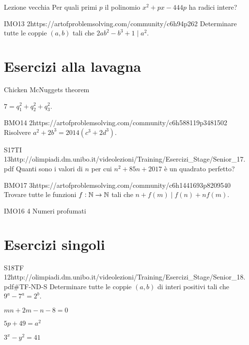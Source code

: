 \documentclass[12pt]{article}
\begin{document}
\begin{esercizio}{Lezione vecchia}{}
    Per quali primi $p$ il polinomio $x^2+px-444p$ ha radici intere?
\end{esercizio}

\begin{esercizio}{IMO13 2}{https://artofproblemsolving.com/community/c6h94p262}
    Determinare tutte le coppie $(a,b)$ tali che $2ab^2-b^3+1\mid a^2$.
\end{esercizio}

\section{Esercizi alla lavagna}

Chicken McNuggets theorem

$7=q_1^2+q_2^2+q_3^2$.

\begin{esercizio}{BMO14 2}{https://artofproblemsolving.com/community/c6h588119p3481502}
    Risolvere $a^2+2b^3=2014(c^3+2d^3)$.
\end{esercizio}

\begin{esercizio}{S17TI 13}{http://olimpiadi.dm.unibo.it/videolezioni/Training/Esercizi_Stage/Senior_17.pdf}
    Quanti sono i valori di $n$ per cui $n^2+85n+2017$ è un quadrato perfetto?
\end{esercizio}

\begin{esercizio}{BMO17 3}{https://artofproblemsolving.com/community/c6h1441693p8209540}
    Trovare tutte le funzioni $f:\mathbb{N}\to\mathbb{N}$ tali che $n+f(m)\mid f(n)+nf(m)$.
\end{esercizio}

\begin{esercizio}{IMO16 4}{}
    Numeri profumati
\end{esercizio}



\section{Esercizi singoli}

\begin{esercizio}{S18TF 12}{http://olimpiadi.dm.unibo.it/videolezioni/Training/Esercizi_Stage/Senior_18.pdf\#TF-ND-S}
    Determinare tutte le coppie $(a,b)$ di interi positivi tali che $9^a-7^a=2^b$.
\end{esercizio}

\begin{esercizio}{}{}
    $mn+2m-n-8=0$
\end{esercizio}

\begin{esercizio}{}{}
    $5p+49=a^2$
\end{esercizio}

\begin{esercizio}{}{}
    $3^x-y^2=41$
\end{esercizio}
\end{document}
